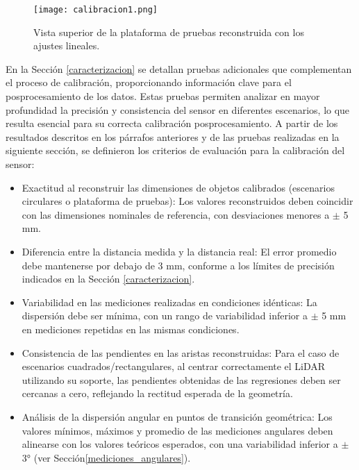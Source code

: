 \begin{figure}[H]
	\centering
	\texttt{[image: calibracion1.png]}
	\caption{Vista superior de la plataforma de pruebas reconstruida con los ajustes lineales.}
	\label{fig:ajuste_lineal_caja}
\end{figure}

En la Sección \ref{caracterizacion} se detallan pruebas adicionales que complementan el proceso de calibración, proporcionando información clave para el posprocesamiento de los datos. Estas pruebas permiten analizar en mayor profundidad la precisión y consistencia del sensor en diferentes escenarios, lo que resulta esencial para su correcta calibración posprocesamiento. A partir de los resultados descritos en los párrafos anteriores y de las pruebas realizadas en la siguiente sección, se definieron los criterios de evaluación para la calibración del sensor:

\begin{itemize}
	\item Exactitud al reconstruir las dimensiones de objetos calibrados (escenarios circulares o plataforma de pruebas): Los valores reconstruidos deben coincidir con las dimensiones nominales de referencia, con desviaciones menores a $\pm$ 5 mm.
	\item Diferencia entre la distancia medida y la distancia real: El error promedio debe mantenerse por debajo de 3 mm, conforme a los límites de precisión indicados en la Sección \ref{caracterizacion}.
	\item Variabilidad en las mediciones realizadas en condiciones idénticas: La dispersión debe ser mínima, con un rango de variabilidad inferior a $\pm$ 5 mm en mediciones repetidas en las mismas condiciones.
	\item Consistencia de las pendientes en las aristas reconstruidas: Para el caso de escenarios cuadrados/rectangulares, al centrar correctamente el LiDAR utilizando su soporte, las pendientes obtenidas de las regresiones deben ser cercanas a cero, reflejando la rectitud esperada de la geometría.
	\item Análisis de la dispersión angular en puntos de transición geométrica: Los valores mínimos, máximos y promedio de las mediciones angulares deben alinearse con los valores teóricos esperados, con una variabilidad inferior a $\pm$ 3° (ver Sección\ref{mediciones_angulares}).
\end{itemize}

